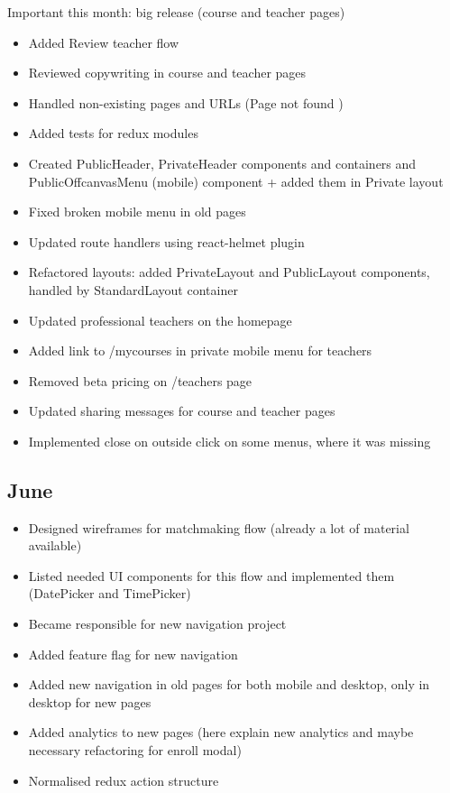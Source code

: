 Important this month: big release (course and teacher pages)

\begin{itemize}
\item Added \guillemotleft Review teacher \guillemotright flow
\item Reviewed copywriting in course and teacher pages
\item Handled non-existing pages and URLs (\guillemotleft Page not found \guillemotright)
\item Added tests for redux modules
\item Created PublicHeader, PrivateHeader components and containers and PublicOffcanvasMenu (mobile) component + added them in Private layout
\item Fixed broken mobile menu in old pages
\item Updated route handlers using react-helmet plugin
\item Refactored layouts: added PrivateLayout and PublicLayout components, handled by StandardLayout container
\item Updated professional teachers on the homepage
\item Added link to /mycourses in private mobile menu for teachers
\item Removed beta pricing on /teachers page
\item Updated sharing messages for course and teacher pages
\item Implemented close on outside click on some menus, where it was missing
\end{itemize}

\subsection{June}
\label{ssec:june}

\begin{itemize}
\item Designed wireframes for matchmaking flow (already a lot of material available)
\item Listed needed UI components for this flow and implemented them (DatePicker and TimePicker)
\item Became responsible for new navigation project
\item Added feature flag for new navigation
\item Added new navigation in old pages for both mobile and desktop, only in desktop for new pages
\item Added analytics to new pages (here explain new analytics and maybe necessary refactoring for enroll modal)
\item Normalised redux action structure
\end{itemize}

